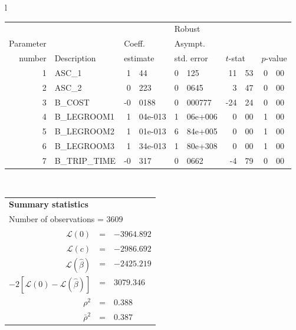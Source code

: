   \begin{tabular}{l}
\begin{tabular}{rlr@{.}lr@{.}lr@{.}lr@{.}l}
         &                       &   \multicolumn{2}{l}{}    & \multicolumn{2}{l}{Robust}  &     \multicolumn{4}{l}{}   \\
Parameter &                       &   \multicolumn{2}{l}{Coeff.}      & \multicolumn{2}{l}{Asympt.}  &     \multicolumn{4}{l}{}   \\
number &  Description                     &   \multicolumn{2}{l}{estimate}      & \multicolumn{2}{l}{std. error}  &   \multicolumn{2}{l}{$t$-stat}  &   \multicolumn{2}{l}{$p$-value}   \\

\hline

1 & ASC\_1 & 1&44 & 0&125 & 11&53 & 0&00 \\
2 & ASC\_2 & 0&223 & 0&0645 & 3&47 & 0&00 \\
3 & B\_COST & -0&0188 & 0&000777 & -24&24 & 0&00 \\
4 & B\_LEGROOM1 & 1&04e-013 & 1&06e+006 & 0&00 & 1&00 \\
5 & B\_LEGROOM2 & 1&01e-013 & 6&84e+005 & 0&00 & 1&00 \\
6 & B\_LEGROOM3 & 1&34e-013 & 1&80e+308 & 0&00 & 1&00 \\
7 & B\_TRIP\_TIME & -0&317 & 0&0662 & -4&79 & 0&00 \\
\hline

\end{tabular}
\\
\begin{tabular}{rcl}
\multicolumn{3}{l}{\bf Summary statistics}\\
\multicolumn{3}{l}{ Number of observations = $3609$} \\
 $\mathcal{L}(0)$ &=&  $-3964.892$ \\
 $\mathcal{L}(c)$ &=& $-2986.692$\\
 $\mathcal{L}(\hat{\beta})$ &=& $-2425.219 $  \\
 $-2[\mathcal{L}(0) -\mathcal{L}(\hat{\beta})]$ &=& $3079.346$ \\
    $\rho^2$ &=&   $0.388$ \\
    $\bar{\rho}^2$ &=&    $0.387$ \\
\end{tabular}
\end{tabular}

